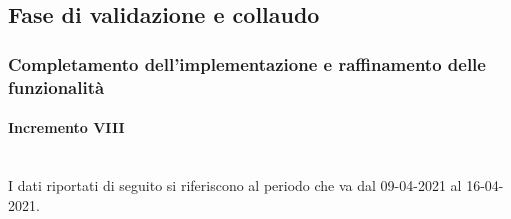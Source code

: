 \subsection{Fase di validazione e collaudo}

\subsubsection{Completamento dell'implementazione e raffinamento delle funzionalità}

\paragraph{Incremento VIII}\mbox{}\\
I dati riportati di seguito si riferiscono al periodo che va dal 09-04-2021 al 16-04-2021.

